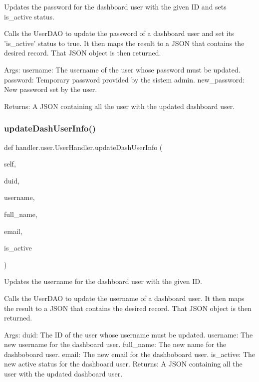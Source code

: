 \begin{DoxyVerb}Updates the password for the dashboard user with the given ID and sets is_active status.

Calls the UserDAO to update the password of a dashboard user and set its 
'is_active' status to true. It then maps the result to a JSON that contains 
the desired record. That JSON object is then returned.

Args:
    username: The username of the user whose password must be updated.
    password: Temporary password provided by the sistem admin.
    new_password: New password set by the user.

Returns:
    A JSON containing all the user with the updated dashboard user.
\end{DoxyVerb}
 \mbox{\label{classhandler_1_1user_1_1_user_handler_ae252ab004847bf2c18292d5ff166a945}} 
\subsubsection{\texorpdfstring{update\+Dash\+User\+Info()}{updateDashUserInfo()}}
{\footnotesize\ttfamily def handler.\+user.\+User\+Handler.\+update\+Dash\+User\+Info (\begin{DoxyParamCaption}\item[{}]{self,  }\item[{}]{duid,  }\item[{}]{username,  }\item[{}]{full\+\_\+name,  }\item[{}]{email,  }\item[{}]{is\+\_\+active }\end{DoxyParamCaption})}

\begin{DoxyVerb}Updates the username for the dashboard user with the given ID.

Calls the UserDAO to update the username of a dashboard user. It then
maps the result to a JSON that contains the desired record. That JSON 
object is then returned.

Args:
    duid: The ID of the user whose username must be updated.
    username: The new username for the dashboard user.
    full_name: The new name for the dashboboard user.
    email: The new email for the dashboboard user.
    is_active: The new active status for the dashboard user.
Returns:
    A JSON containing all the user with the updated dashboard user. 
\end{DoxyVerb}
 \mbox{\label{classhandler_1_1user_1_1_user_handler_a56eaeae0434a67f7d99f4d7c670afdc9}} 

